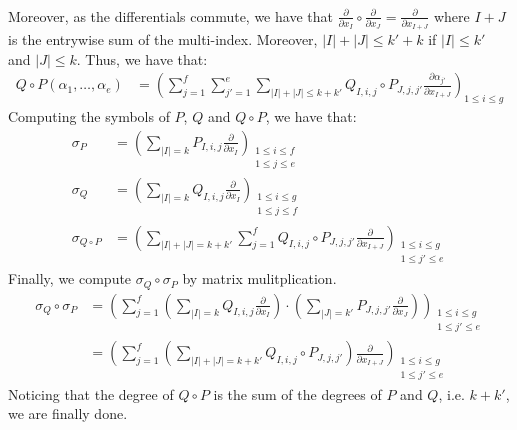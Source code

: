 \documentclass[12pt]{article}
\begin{document}
\begin{solution}
\begin{align*}
    \end{align*}
    Moreover, as the differentials commute, we have that $\frac{\partial}{\partial x_I} \circ \frac{\partial }{\partial x_{J}} = \frac{\partial }{\partial x_{I+J}}$ where $I+J$ is the entrywise sum of the multi-index. Moreover, $|I| + |J| \leq k' + k$ if $|I| \leq k'$ and $|J| \leq k$. Thus, we have that:  
    \begin{align*}
            Q \circ P(\alpha_1, \ldots, \alpha_e) &= \left(\sum_{j=1}^f \sum_{j'=1}^e \sum_{|I|+|J|\leq k+k'} Q_{I, i, j} \circ P_{J, j, j'}  \frac{\partial \alpha_{j'}}{\partial x_{I+J}} \right)_{1 \leq i \leq g }
    \end{align*}
    Computing the symbols of $P$, $Q$ and $Q \circ P$, we have that:
    \begin{align*}
        \sigma_P &= \left(\sum_{|I| = k} P_{I, i, j} \frac{\partial}{\partial x_I} \right)_{\substack{1 \leq i \leq f \\ 1 \leq j \leq e}} \\ 
        \sigma_Q &= \left(\sum_{|I| = k} Q_{I, i, j} \frac{\partial}{\partial x_I} \right)_{\substack{1 \leq i \leq g \\ 1 \leq j \leq f}} \\ 
        \sigma_{Q\circ P} &= \left(\sum_{|I|+|J| = k+k'} \sum_{j=1}^f Q_{I, i, j} \circ P_{J, j, j'}\frac{\partial}{\partial x_{I+J}} \right)_{\substack{1 \leq i \leq g \\ 1 \leq j' \leq e}} 
    \end{align*}
    Finally, we compute $\sigma_Q \circ \sigma_P$ by matrix mulitplication. 
    \begin{align*}
        \sigma_Q \circ \sigma_P &=  \left(\sum_{j=1}^f\left(\sum_{|I| = k} Q_{I, i, j} \frac{\partial}{\partial x_I}\right) \cdot \left(\sum_{|J| = k'} P_{J, j, j'} \frac{\partial}{\partial x_J}  \right)\right)_{\substack{1 \leq i \leq g \\ 1 \leq j' \leq e}} \\
        &= \left(\sum_{j=1}^f\left(\sum_{|I|+|J| = k+k'} Q_{I, i, j} \circ P_{J, j, j'}\right) \frac{\partial}{\partial x_{I+J}} \right)_{\substack{1 \leq i \leq g \\ 1 \leq j' \leq e}}
    \end{align*}
    Noticing that the degree of $Q \circ P$ is the sum of the degrees of $P$ and $Q$, i.e. $k+k'$, we are finally done.
\end{solution}
\newpage
\end{document}
